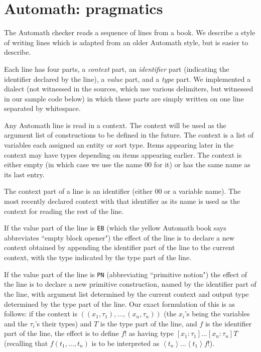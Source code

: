 \documentclass[submission,copyright,creativecommons]{eptcs}
\begin{document}
\section{Automath:  pragmatics}

The Automath checker reads a sequence of lines from a book.  We describe a style of writing lines which is adapted from an older Automath style, but is easier to describe.

Each line has four parts, a {\em context\/} part, an {\em identifier\/} part (indicating the identifier declared by the line), a {\em value\/} part, and a {\em type\/} part.  We implemented a dialect (not witnessed in the sources, which use various delimiters, but witnessed in our sample code below) in which these parts are simply written on one line separated by whitespace.

Any Automath line is read in a context.  The context will be used as the argument list of constructions to be defined in the future.  The context is a list of variables each assigned an entity or sort type.  Items appearing later in the context may have types depending on items appearing earlier.  The context is either empty (in which case we use the name 00 for it) or has the same name as its last entry.

The context part of a line is an identifier (either 00 or a variable name).  The most recently declared context with that identifier as its name
is used as the context for reading the rest of the line.


If the value part of the line is {\tt EB} (which the yellow Automath book says abbreviates ``empty block opener") the effect of the line is to declare a new context obtained by appending the identifier part of the line to the current context, with the type indicated by the type part of the line.

If the value part of the line is {\tt PN} (abbreviating ``primitive notion") the effect of the line is to declare a new primitive construction, named by the identifier part of the line, with argument list determined by the current context and output type determined by the type part of the line.  Our exact formulation of this
is as follows:  if the context is $((x_1,\tau_1),\ldots,(x_n,\tau_n))$ (the $x_i$'s being the variables and the $\tau_i$'s their types) and $T$ is the type part of the line, and $f$ is the identifier part of the line, the effect is to define $f!$ as having type $[x_1:\tau_1]\ldots[x_n:\tau_n]T$ (recalling that
$f(t_1,\ldots,t_n)$ is to be interpreted as $\left<t_n\right>\ldots\left<t_1\right>f!$).
\end{document}

